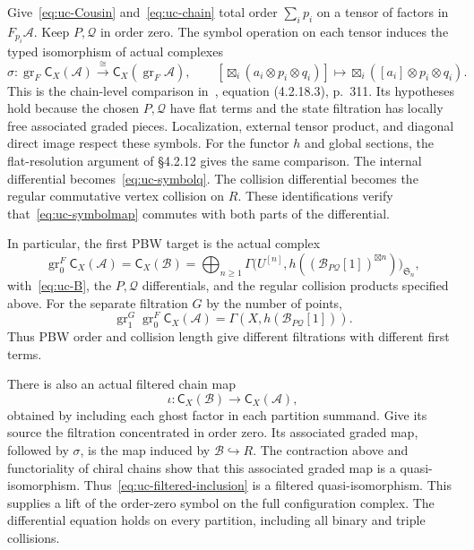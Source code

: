 Give~\eqref{eq:uc-Cousin} and~\eqref{eq:uc-chain} total order $\sum_i p_i$ on a tensor of factors in $F_{p_i}\mathcal A$.
Keep $P,\mathcal Q$ in order zero.
The symbol operation on each tensor induces the typed isomorphism of actual complexes
\begin{equation}\label{eq:uc-symbolmap}
 \sigma:\operatorname{gr}_F\mathsf C_X(\mathcal A)
 \xrightarrow{\ \cong\ }
 \mathsf C_X(\operatorname{gr}_F\mathcal A),
 \qquad
 [\boxtimes_i(a_i\otimes p_i\otimes q_i)]
 \longmapsto\boxtimes_i([a_i]\otimes p_i\otimes q_i).
\end{equation}
This is the chain-level comparison in~\cite{BD026}, equation (4.2.18.3), p.~311.
Its hypotheses hold because the chosen $P,\mathcal Q$ have flat terms and the state filtration has locally free associated graded pieces.
Localization, external tensor product, and diagonal direct image respect these symbols.
For the functor $h$ and global sections, the flat-resolution argument of \S4.2.12 gives the same comparison.
The internal differential becomes~\eqref{eq:uc-symbolq}.
The collision differential becomes the regular commutative vertex collision on $R$.
These identifications verify that~\eqref{eq:uc-symbolmap} commutes with both parts of the differential.

In particular, the first PBW target is the actual complex
\begin{equation}\label{eq:uc-grzero}
 \operatorname{gr}^F_0\mathsf C_X(\mathcal A)
 =\mathsf C_X(\mathcal B)
 =\bigoplus_{n\geq1}
 \Gamma\bigl(U^{[n]},h((\mathcal B_{P\mathcal Q}[1])^{\boxtimes n})\bigr)_{\mathfrak S_n},
\end{equation}
with~\eqref{eq:uc-B}, the $P,\mathcal Q$ differentials, and the regular collision products specified above.
For the separate filtration $G$ by the number of points,
\[
 \operatorname{gr}^G_1\operatorname{gr}^F_0\mathsf C_X(\mathcal A)
 =\Gamma(X,h(\mathcal B_{P\mathcal Q}[1])).
\]
Thus PBW order and collision length give different filtrations with different first terms.

There is also an actual filtered chain map
\begin{equation}\label{eq:uc-filtered-inclusion}
 \iota:\mathsf C_X(\mathcal B)\longrightarrow\mathsf C_X(\mathcal A),
\end{equation}
obtained by including each ghost factor in each partition summand.
Give its source the filtration concentrated in order zero.
Its associated graded map, followed by $\sigma$, is the map induced by $\mathcal B\hookrightarrow R$.
The contraction above and functoriality of chiral chains show that this associated graded map is a quasi-isomorphism.
Thus~\eqref{eq:uc-filtered-inclusion} is a filtered quasi-isomorphism.
This supplies a lift of the order-zero symbol on the full configuration complex.
The differential equation holds on every partition, including all binary and triple collisions.

